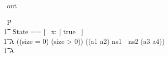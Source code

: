 \begin{circus}
    \circchannel\ out
\end{circus}

\begin{circus}
    \circprocess\ P \circdef \circbegin \\
         \t1 \circstate\ State == [~ x: \nat | true ~] \\
        \t1 A \circdef \lcircguard ((size = 0) \lor (size > 0)) \rcircguard \circguard ((a1 \extchoice a2) \linter ns1 | ns2 \rinter (a3 \extchoice a4))
                    \\ %
        \t1 \circspot A
    \circend
\end{circus}

